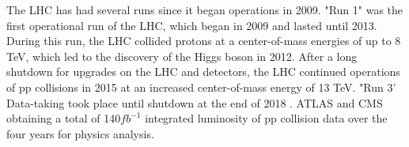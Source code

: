 The LHC has had several runs since it began operations in 2009. "Run 1" was the first operational run of the LHC, which began in 2009 and lasted until 2013. During this run, the LHC collided protons at a center-of-mass energies of up to 8 TeV, which led to the discovery of the Higgs boson in 2012. After a long shutdown for upgrades on the LHC and detectors, the LHC continued operations of pp collisions in 2015 at an increased center-of-mass energy of 13 TeV. "Run 3' Data-taking took place until shutdown at the end of 2018 . ATLAS and CMS obtaining a total of 140$fb^{-1}$ integrated luminosity of pp collision data over the four years for physics analysis.